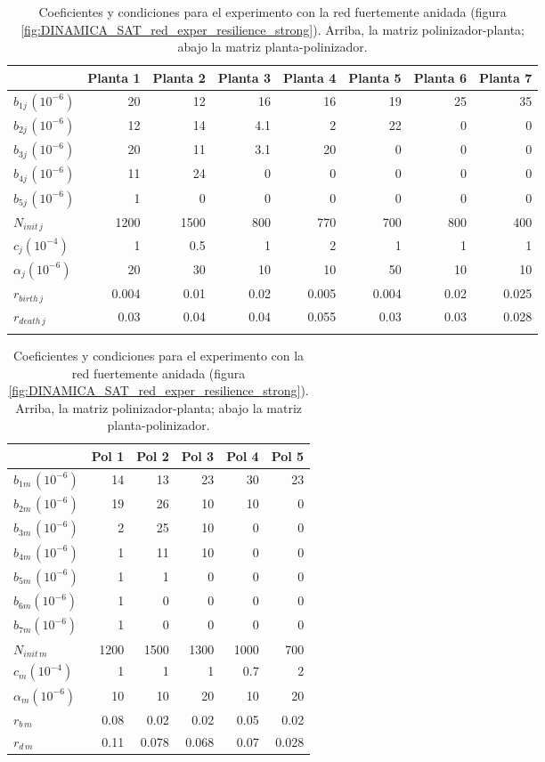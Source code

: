 \begin{table}
\centering
\scriptsize
\begin{tabular}{lrrrrrrr}
\hline
 &Planta 1&Planta 2&Planta 3&Planta 4&Planta 5&Planta 6&Planta 7\\
\hline
$b_{1j\, }${\tiny $\left(10^{-6}\right)$}&20&12&16&16&19&25&35\\
$b_{2j\, }${\tiny $\left(10^{-6}\right)$}&12&14&4.1&2&22&0&0\\
$b_{3j\, }${\tiny $\left(10^{-6}\right)$}&20&11&3.1&20&0&0&0\\
$b_{4j\, }${\tiny $\left(10^{-6}\right)$}&11&24&0&0&0&0&0\\
$b_{5j\, }${\tiny $\left(10^{-6}\right)$}&1&0&0&0&0&0&0\\
$N_{init\,j}$&1200 & 1500 & 800 & 770 & 700 & 800 & 400\\
$c_{j}${\tiny $\left(10^{-4}\right)$} & 1 & 0.5 & 1 & 2 & 1 & 1 & 1\\
$\alpha_{j}${\tiny $\left(10^{-6}\right)$} & 20 & 30 & 10 & 10 & 50 & 10 &10\\
$r_{birth\, j}$ & 0.004 & 0.01 & 0.02 & 0.005 & 0.004 & 0.02 & 0.025\\
$r_{death\, j}$ & 0.03 & 0.04 & 0.04 & 0.055 & 0.03 & 0.03 & 0.028\\
\hline
\\
\end{tabular}
\centering
\begin{tabular}{lrrrrr}
\hline
 &Pol 1&Pol 2&Pol 3&Pol 4&Pol 5\\
\hline
$b_{1m\,}${\tiny $\left(10^{-6}\right)$}&14&13&23&30&23\\
$b_{2m\,}${\tiny $\left(10^{-6}\right)$}&19&26&10&10&0\\
$b_{3m\,}${\tiny $\left(10^{-6}\right)$}&2&25&10&0&0\\
$b_{4m\,}${\tiny $\left(10^{-6}\right)$}&1&11&10&0&0\\
$b_{5m\,}${\tiny $\left(10^{-6}\right)$}&1&1&0&0&0\\
$b_{6m}${\tiny $\left(10^{-6}\right)$}&1&0&0&0&0\\
$b_{7m}${\tiny $\left(10^{-6}\right)$}&1&0&0&0&0\\
$N_{init\,m}$ & 1200 & 1500 & 1300 & 1000 & 700 \\
$c_{m}${\tiny $\left(10^{-4}\right)$} & 1 & 1 & 1 & 0.7 & 2\\
$\alpha_{m}${\tiny $\left(10^{-6}\right)$} & 10 & 10 & 20 & 10 & 20\\
$r_{b\, m}$ & 0.08 & 0.02 & 0.02 & 0.05 & 0.02 \\
$r_{d\, m}$ & 0.11 & 0.078 & 0.068 & 0.07 & 0.028 \\
\hline
\end{tabular}
\normalsize
\caption{Coeficientes y condiciones para el experimento con la red fuertemente anidada (figura \ref{fig:DINAMICA_SAT_red_exper_resilience_strong}). Arriba, la matriz polinizador-planta; abajo la matriz planta-polinizador.}
\label{tab:SAT_exper_resilience_strong}
\end{table}

